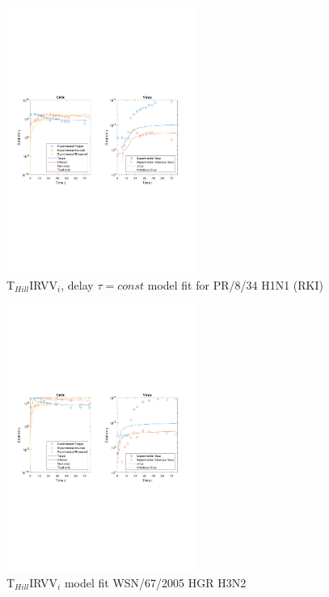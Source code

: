 \begin{figure}[H]
\begin{center}
\includegraphics[width=0.55\textwidth, trim={1cm 9.8cm 1cm 9.5cm}, clip]{D_chapters/6_appendix/4_ValidationRKI/InfectionDepletionModelTHillIRVViDelayFitTauMOI0.025log.pdf}
\caption[T$_{Hill}$IRVV$_i$, delay $\tau = const$ model fit for PR/8/34 H1N1 (RKI)]%
{T$_{Hill}$IRVV$_i$, delay $\tau = const$ model fit for PR/8/34 H1N1 (RKI)}
\label{figure:THillIRVViDelayFitTauValidationRKI}
\end{center}
\end{figure}

\newpage

\begin{figure}[H]
\begin{center}
\includegraphics[width=0.55\textwidth, trim={1cm 9.8cm 1cm 9.5cm}, clip]{D_chapters/6_appendix/4_ValidationH3N2/InfectionDepletionModelTHillIRVViMOI0.002log.pdf}
\caption[T$_{Hill}$IRVV$_i$ model fit for WSN/67/2005 HGR H3N2]%
{T$_{Hill}$IRVV$_i$ model fit WSN/67/2005 HGR H3N2}
\label{figure:THillIRVViValidationRKI}
\end{center}
\end{figure}

